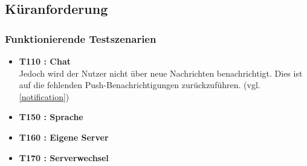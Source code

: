 \documentclass[parskip=full,11pt]{scrartcl}
\begin{document}
	\subsection{Küranforderung}
		\subsubsection{Funktionierende Testszenarien}
			\begin{itemize}
				\item \textbf{T110 : Chat}\\
				 			Jedoch wird der Nutzer nicht über neue Nachrichten benachrichtigt.
							Dies ist auf die fehlenden Push-Benachrichtigungen zurückzuführen.
							(vgl. \ref{notification})
				\item \textbf{T150 : Sprache}
				\item \textbf{T160 : Eigene Server}
				\item \textbf{T170 : Serverwechsel}
	    \end{itemize}
\end{document}
